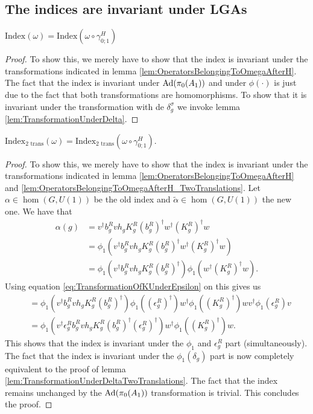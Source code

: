 \documentclass[11pt,a4paper,twoside]{article}
\numberwithin{equation}{section}
\begin{document}
	\subsection{The indices are invariant under LGAs}\label{sec:IndexInvariantUnderLGA}
	\begin{theorem}\label{thrm:IndexInvariantUnderLGA}
		$\textrm{Index}(\omega)=\textrm{Index}(\omega\circ\gamma^H_{0;1})$
	\end{theorem}
	\begin{proof}
		To show this, we merely have to show that the index is invariant under the transformations indicated in lemma \ref{lem:OperatorsBelongingToOmegaAfterH}. The fact that the index is invariant under $\Ad{\pi_0(A_1)}$ and under $\phi(\cdot)$ is just due to the fact that both transformations are homomorphisms. To show that it is invariant under the transformation with de $\delta^\sigma_g$ we invoke lemma \ref{lem:TransformationUnderDelta}.
	\end{proof}
	\begin{theorem}\label{thrm:IndexInvariantUnderLGA_TwoTrans}
		$\textrm{Index}_{\text{2 trans}}(\omega)=\textrm{Index}_{\text{2 trans}}(\omega\circ\gamma^H_{0;1}).$
	\end{theorem}
	\begin{proof}
		To show this, we merely have to show that the index is invariant under the transformations indicated in lemma \ref{lem:OperatorsBelongingToOmegaAfterH} and \ref{lem:OperatorsBelongingToOmegaAfterH_TwoTranslations}. Let $\alpha\in\hom(G,U(1))$ be the old index and $\tilde{\alpha}\in\hom(G,U(1))$ the new one. We have that
		\begin{align}
			\alpha(g)&=v^\dagger b_g^R v h_g K_g^R (b_g^R)^\dagger w^\dagger (K_g^R)^\dagger w\\
			&=\phi_1(v^\dagger b_g^R v h_g K_g^R (b_g^R)^\dagger w^\dagger (K_g^R)^\dagger w)\\
			&=\phi_1(v^\dagger b_g^R v h_g K_g^R (b_g^R)^\dagger)\phi_1( w^\dagger (K_g^R)^\dagger w).
		\end{align}
		Using equation \eqref{eq:TransformationOfKUnderEpsilon} on this gives us
		\begin{align}
			&=\phi_1(v^\dagger b_g^R v h_g K_g^R (b_g^R)^\dagger)\phi_1((\epsilon_g^R)^\dagger)w^\dagger\phi_1(  (K_g^R)^\dagger )wv^\dagger \phi_1(\epsilon_g^R)v\\
			&=\phi_1(v^\dagger \epsilon_g^R b_g^R v h_g K_g^R (b_g^R)^\dagger (\epsilon_g^R)^\dagger)w^\dagger\phi_1(  (K_g^R)^\dagger )w.
		\end{align}
		This shows that the index is invariant under the $\phi_1$ and $\epsilon^R_g$ part (simultaneously). The fact that the index is invariant under the $\phi_1(\delta_g)$ part is now completely equivalent to the proof of lemma \ref{lem:TransformationUnderDeltaTwoTranslations}. The fact that the index remains unchanged by the $\Ad{\pi_0(A_1)}$ transformation is trivial. This concludes the proof.
	\end{proof}
\end{document}
